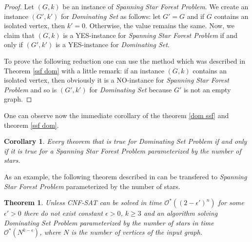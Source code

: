 \documentclass[en]{pracamgr}
\newtheorem{theorem}{Theorem}
\newtheorem{corollary}{Corollary}
\newcommand{\ssfp}{\emph{Spanning Star Forest Problem}}
\newcommand{\domset}{\emph{Dominating Set}}
\newcommand{\domsetp}{\emph{Dominating Set Problem}}
\newcommand{\kssf}{\emph{Spanning Star Forest Problem} parameterized by the number of stars}
\newcommand{\cnfsat}{\emph{CNF-SAT}}
\begin{document}
\begin{proof}
	Let $(G,k)$ be an instance of \ssfp{}. We create an instance $(G',k')$ for \domset{} as follows: let $G'=G$ and if $G$ contains an isolated vertex, then $k'=0$. Otherwise, the value remains the same. Now, we claim that $(G,k)$ is a YES-instance for \ssfp{} if and only if $(G',k')$ is a YES-instance for \domset.
	
	To prove the following reduction one can use the method which was described in Theorem \ref{ssf dom} with a little remark: if an instance $(G,k)$ contains an isolated vertex, then obviously it is a NO-instance for \ssfp{} and so is $(G',k')$ for \domset{} because $G'$ is not an empty graph.
\end{proof}

One can observe now the immediate corollary of the theorem \ref{dom ssf} and theorem \ref{ssf dom}.

\begin{corollary}
	Every theorem that is true for \domsetp{} if and only if it is true for a \kssf{}.
\end{corollary}

As an example, the following theorem described in 
can be transfered to \kssf{}.

\begin{theorem}
	Unless \cnfsat{} can be solved in time $\mathcal{O}^*((2-\epsilon')^n)$ for some $\epsilon' > 0$ there do not exist constant $\epsilon > 0$, $k \geq 3$ and an algorithm solving \domsetp{} parameterized by the number of stars in time $\mathcal{O}^*(N^{k-\epsilon})$, where $N$ is the number of vertices of the input graph.
\end{theorem}
\end{document}
